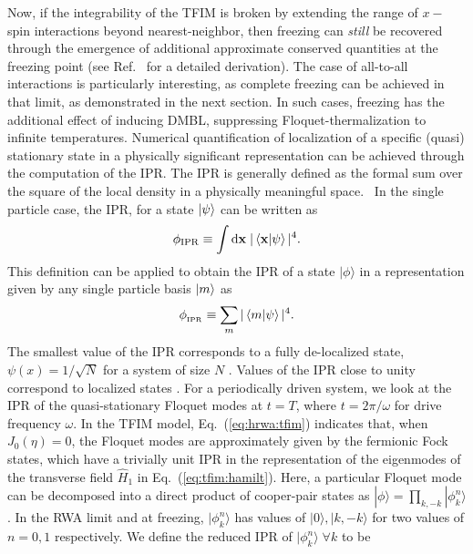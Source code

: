 \documentclass[%
reprint,
superscriptaddress,
amsmath,amssymb,
aps,
prb,
showkeys,
]{revtex4-2}
\begin{document}
Now, if the integrability of the TFIM is broken by extending the range of $x-$spin interactions beyond nearest-neighbor, then freezing can \textit{still} be recovered through the emergence of additional approximate conserved quantities at the freezing point (see Ref.~\cite{rahaman2024time} for a detailed derivation). The case of all-to-all interactions is particularly interesting, as complete freezing can be achieved in that limit, as demonstrated in the next section. In such cases, freezing has the additional effect of inducing DMBL, suppressing Floquet-thermalization to infinite temperatures. Numerical quantification of localization of a specific (quasi) stationary state in a physically significant representation can be achieved through the computation of the IPR.  {The IPR is generally defined as the formal sum over the square of the local density in a physically meaningful space.}~\cite{mukherjee_modulation-assisted_2015,lin_many-body_2018,murphy_generalized_2011, torres-herrera_self-averaging_2020} {In the single particle case,  the IPR, } for a state $\ket{\psi}$ can be written as
\begin{equation*}
	\phi_{\mathrm{IPR}}\equiv \int \mathrm{d}\mathbf{x}\;\vert\ip{\mathbf{x}}{\psi}\vert^4.
\end{equation*}
This definition can be {applied} to {obtain} the IPR of a state $|\phi\rangle$ in a representation given by {any single particle} basis $\ket{m}$ as 
\begin{equation}
	\label{eq:ipr:defn}
	\phi_{{_\mathrm{IPR}}} \equiv \sum_m\vert\ip{m}{\psi}\vert^4.
\end{equation}
The smallest value of the IPR corresponds to a fully de-localized state, $\psi(x)=1/\sqrt{N}$ for a system of size $N$ \cite{torres-herrera_self-averaging_2020,trivedi_can_2005}. Values of the IPR close to unity correspond to localized states \cite{Misguich2016}. For a periodically driven system, we look at the IPR of the quasi-stationary Floquet modes at $t=T$, where $t=2\pi/\omega$ for drive frequency $\omega$. In the TFIM model, Eq.~(\ref{eq:hrwa:tfim}) indicates that, when $J_0(\eta)=0$, the Floquet modes are approximately given by the fermionic Fock states, which have a trivially unit IPR in the representation of the eigenmodes of the transverse field $\hat{H}_1$ in Eq.~(\ref{eq:tfim:hamilt}). Here, a particular Floquet mode can be decomposed into a direct product of cooper-pair states as $|\phi\rangle = \prod_{k,-k}|\phi^n_k\rangle$. In the RWA limit and at freezing, $|\phi^n_k\rangle$ has values of $|0\rangle, |k,-k\rangle$ for two values of $n=0,1$ respectively. We define the reduced IPR of $|\phi^n_k\rangle\; \forall k$ to be
\end{document}
